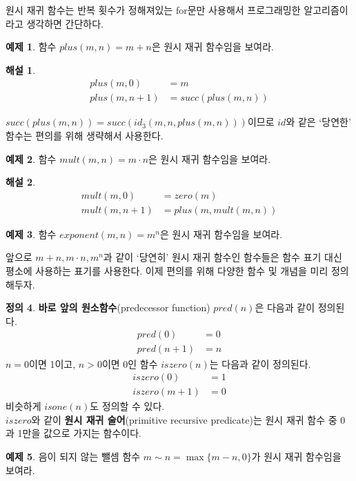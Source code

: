 \documentclass[b5paper, 11pt]{book}
\theoremstyle{definition}
\newtheorem{defn}{정의}[chapter]
\newtheorem{ex}[defn]{예제}
\newtheorem*{ans*}{해설}
\begin{document}
원시 재귀 함수는 반복 횟수가 정해져있는 for문만 사용해서 프로그래밍한  알고리즘이라고 생각하면 간단하다.
\begin{ex}
    함수 $plus(m, n) = m+n$은 원시 재귀 함수임을 보여라. 
\end{ex}
\begin{ans*}
    \begin{align*}
        plus(m, 0) &= m \\
        plus(m, n+1) &= succ(plus(m, n)) 
    \end{align*}
\end{ans*}
$succ(plus(m,n)) = succ(id_3(m, n, plus(m, n)))$이므로 $id$와 같은 `당연한' 함수는 편의를 위해 생략해서 사용한다.
\begin{ex}
    함수 $mult(m,n) = m\cdot n$은 원시 재귀 함수임을 보여라.
\end{ex}
\begin{ans*}
    \begin{align*}
        mult(m,0) &= zero(m) \\ 
        mult(m,n+1) &= plus(m,mult(m,n))
    \end{align*}
\end{ans*}
\begin{ex}
    함수 $exponent(m,n) = m^n$은 원시 재귀 함수임을 보여라.
\end{ex}
앞으로 $m+n, m\cdot n, m^n$과 같이 `당연히' 원시 재귀 함수인 함수들은 함수 표기 대신 평소에 사용하는 표기를 사용한다. 이제 편의를 위해 다양한 함수 및 개념을 미리 정의해두자. 
\begin{defn}
    \textbf{바로 앞의 원소함수}(predecessor function) $pred(n)$은 다음과 같이 정의된다.
    \begin{align*}
        pred(0) &= 0 \\ 
        pred(n+1) &= n
    \end{align*}
    $n = 0$이면 1이고, $n>0$이면 0인 함수 $iszero(n)$는 다음과 같이 정의된다.
    \begin{align*}
        iszero(0) &= 1 \\ 
        iszero(m+1) &= 0 
    \end{align*}
    비슷하게 $isone(n)$도 정의할 수 있다. \\ 
    $iszero$와 같이 \textbf{원시 재귀 술어}(primitive recursive predicate)는 원시 재귀 함수 중 0과 1만을 값으로 가지는 함수이다.
\end{defn}
\begin{ex}
    음이 되지 않는 뺄셈 함수 $m \sim n = \max \{ m - n , 0\}$가 원시 재귀 함수임을 보여라.
\end{ex}
\end{document}
